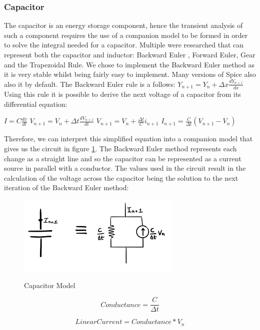 \documentclass{article}
\begin{document}
\subsubsection{Capacitor}
The capacitor is an energy storage component, hence the transient analysis of such a component requires the use of a companion model to be formed in order to solve the integral needed for a capacitor. Multiple were researched\cite{NumericalMethods} that can represent both the capacitor and inductor: Backward Euler , Forward Euler, Gear and the Trapezoidal Rule\cite{IntegrationMethods}. We chose to implement the Backward Euler method as it is very stable whilst being fairly easy to implement. Many versions of Spice also also it by default. 
The Backward Euler rule is a follows: \bigbreak
$Y_{n+1} = Y_n + \Delta x\frac{dY_{n+1}}{dx}$ \bigbreak
Using this rule it is possible to derive the next voltage of a capacitor from its differential equation:
\bigbreak

$I = C\frac{dv}{dt}$
\medbreak
$V_{n+1} = V_n + \Delta t\frac{dV_{n+1}}{dt}$
\medbreak
$V_{n+1} = V_n + \frac{\Delta t}{C}i_{n+1}$
\medbreak
$I_{n+1} = \frac{C}{\Delta t}(V_{n+1}-V_n)$
\bigbreak

Therefore, we can interpret this simplified equation into a companion model that gives us the circuit in figure \ref{fig:CapModel}. The Backward Euler method represents each change as a straight line and so the capacitor can be represented as a current source in parallel with a conductor. The values used in the circuit result in the calculation of the voltage across the capacitor being the solution to the next iteration of the Backward Euler method: 

\begin{figure}[h]
    \caption{Capacitor Model}
    \centering
    \includegraphics[width=0.7\textwidth]{images/CapModel.jpg}
    \label{fig:CapModel}
\end{figure}

\bigbreak

\noindent\begin{minipage}{.4\linewidth}
\begin{equation}
  Conductance = \frac{C}{\Delta t}
\end{equation}
\end{minipage}%
\begin{minipage}{.7\linewidth}
\begin{equation}
  LinearCurrent = Conductance*V_n
\end{equation}
\end{minipage}
\end{document}
